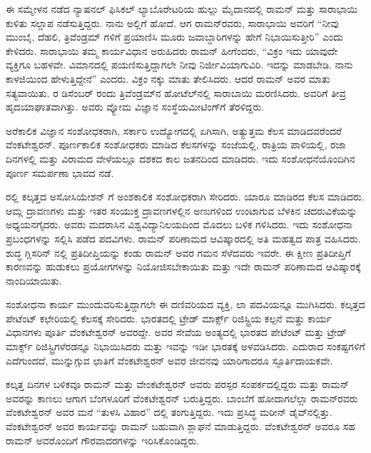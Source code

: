 ಈ ಸಮ್ಮೇಳನ ನಡೆದ ನ್ಯಾಷನಲ್ ಫಿಸಿಕಲ್ ಲ್ಯಾಬೊರೇಟರಿಯ ಹುಲ್ಲು ಮೈದಾನದಲ್ಲಿ ರಾಮನ್ ಮತ್ತು ಸಾರಾಭಾಯಿ ಕುಳಿತು ಸಲ್ಲಾಪ ನಡೆಸುತ್ತಿದ್ದರು. ನಾನು ಅಲ್ಲಿಗೆ ಹೋದೆ. ಆಗ ರಾಮನ್‍ರವರು, ಸಾರಾಭಾಯಿ ಅವರಿಗೆ “ನೀವು ಮುಂಬೈ, ದೆಹಲಿ, ತ್ರಿವೆಂಡ್ರಮ್ ಗಳಿಗೆ ಪ್ರಯಾಣಿಸಿ ಮೂರು ಜವಾಬ್ದಾರಿಗಳನ್ನು ಹೇಗೆ ನಿಭಾಯಿಸುತ್ತೀರಿ” ಎಂದು ಕೇಳಿದರು. ಸಾರಾಭಾಯಿ ತಮ್ಮ ಕಾರ್ಯವಿಧಾನ ಅರುಹಿದರು ರಾಮನ್ ಹೀಗೆಂದರು, “ವಿಕ್ರಂ ಇದು ಯಾವುದೇ ವ್ಯಕ್ತಿಗೂ ಬಹಳವೇ. ವಿಮಾನದಲ್ಲಿ ಪಯಣಿಸುತ್ತಿದ್ದಾಗಲೇ ನೀವು ನಿರ್ಜೀವಿಯಾಗುವಿರಿ. ಇದನ್ನು ಮಾಡಬೇಡಿ. ನಾನು ಕಾಳಜಿಯಿಂದ ಹೇಳುತ್ತಿದ್ದೇನೆ” ಎಂದರು. ವಿಕ್ರಂ ನಕ್ಕು ಮಾತು ತೇಲಿಸಿದರು. ಆದರೆ ರಾಮನ್ ಅವರ ಮಾತು ಸತ್ಯವಾಯಿತು. ರ ಡಿಸೆಂಬರ್ ರಂದು ತ್ರಿವೆಂಡ್ರಮ್‍ನ ಹೋಟೆಲ್‍ನಲ್ಲಿ ಸಾರಾಬಾಯಿ ಮರಣಿಸಿದರು. ಅವರಿಗೆ ತೀವ್ರ ಹೃದಯಾಘಾತವಾಗಿತ್ತು. ಅವರು ವ್ಯೋಮ ವಿಜ್ಞಾನ ಸಂಸ್ಥೆಯ\break ಮೀಟಿಂಗ್‍ಗೆ ತೆರಳಿದ್ದರು.



ಅರೆಕಾಲಿಕ ವಿಜ್ಞಾನ ಸಂಶೋಧಕರಾಗಿ, ಸರ್ಕಾರಿ ಉದ್ಯೋಗದಲ್ಲಿ ಏಗಿಸಾಗಿ, ಅತ್ಯುತ್ತಮ ಕೆಲಸ ಮಾಡಿದವರೆಂದರೆ ವೆಂಕಟೇಶ್ವರನ್. ಪೂರ್ಣಕಾಲಿಕ ಸಂಶೋಧಕರು ಮಾಡಿದ ಕೆಲಸಗಳನ್ನು ಸಂಜೆಯಲ್ಲಿ, ರಾತ್ರಿಯ ಪಾಳಿಯಲ್ಲಿ, ರಜಾ ದಿನಗಳಲ್ಲಿ ಮತ್ತು ವಿರಾಮದ ವೇಳೆಯಲ್ಲೂ ದಶಕದ ಕಾಲ ಜತನದಿಂದ ಮಾಡಿದರು. ಇದು ಸಂಶೋಧನೆಯೊಂದಿಗಿನ ಪೂರ್ಣ ಸಮರ್ಪಣಾ ಭಾವದ ನಡೆ.

ರಲ್ಲಿ ಕಲ್ಕತ್ತದ ಅಸೋಸಿಯೇಶನ್ ಗೆ ಅಂಶಕಾಲಿಕ ಸಂಶೋಧಕರಾಗಿ ಸೇರಿದರು. ಯಾರೂ ಮಾಡಿರದ ಕೆಲಸ ಮಾಡಿದರು. ಆಮ್ಲ ದ್ರಾವಣಗಳು ಮತ್ತು ಇತರ ಸಂಯುಕ್ತ ದ್ರಾವಣಗಳಲ್ಲಿನ ಅಣುಗಳಿಂದ ಉಂಟಾಗುವ ಬೆಳಕಿನ ಚದರುವಿಕೆಯನ್ನು ಅಧ್ಯಯನಗೈದರು. ಅವರು ಮದರಾಸಿನ ವಿಶ್ವವಿದ್ಯಾನಿಲಯದಿಂದ ಮೊದಲು  ಬಳಿಕ  ಗಳಿಸಿದರು. ಇದು ಸಂಶೋಧನಾ ಪ್ರಬಂಧಗಳನ್ನು ಸಲ್ಲಿಸಿ ಪಡೆದ ಪದವಿಗಳು. ರಾಮನ್ ಪರಿಣಾಮದ ಆವಿಷ್ಕಾರದಲ್ಲಿ ಅತಿ ಮಹತ್ವದ ಪಾತ್ರ ವಹಿಸಿದರು. ಶುದ್ಧ ಗ್ಲಿಸರಿನ್ ನಲ್ಲಿ ಪ್ರತಿದೀಪ್ತಿಯನ್ನು ಕಂಡು ರಾಮನ್ ಅವರ ಗಮನ ಸೆಳೆದವರು ಇವರೇ. ಈ ಕ್ಷೀಣ ಪ್ರತಿದೀಪ್ತಿಗೆ ಕಾರಣವನ್ನು ಹುಡುಕಲು ಪ್ರಯೋಗಗಳನ್ನು ನಿಯೋಜಿಸಬೇಕಾಯಿತು ಮತ್ತು ಇದೇ ರಾಮನ್ ಪರಿಣಾಮದ ಆವಿಷ್ಕಾರಕ್ಕೆ ನಾಂದಿಯಾಯಿತು.

ಸಂಶೋಧನಾ ಕಾರ್ಯ ಮುಂದುವರಿಸುತ್ತಿದ್ದಾಗಲೇ ಈ ದಣಿವರಿಯದ ವ್ಯಕ್ತಿ, ಲಾ ಪದವಿಯನ್ನೂ ಮುಗಿಸಿದರು. ಕಲ್ಕತ್ತದ ಪೇಟೆಂಟ್ ಕಛೇರಿಯಲ್ಲಿ ಕೆಲಸಕ್ಕೆ ಸೇರಿದರು. ಭಾರತದಲ್ಲಿ ಟ್ರೇಡ್ ಮಾರ್ಕ್ಸ್ ರಿಜಿಸ್ಟ್ರಿಯ ಕಲ್ಪನೆ ಮತ್ತು ಕಾರ್ಯ ವಿಧಾನಗಳು ಪೂರ್ತಿ ವೆಂಕಟೇಶ್ವರನ್ ಅವರದ್ದೇ. ಅವರ ಸೇವೆಯ ಅಂತ್ಯದಲ್ಲಿ ಭಾರತದ ಪೇಟೆಂಟ್ ಮತ್ತು ಟ್ರೇಡ್ ಮಾರ್ಕ್ಸ್ ರಿಜಿಸ್ಟ್ರಿಗಳೆರಡನ್ನೂ ನಿಭಾಯಿಸಿದರು ಮತ್ತು ಇವನ್ನು ಇಡೀ ಭಾರತಕ್ಕೆ ಅಳವಡಿಸಿದರು. ಎದುರಾದ ಸಂಕಷ್ಟಗಳಿಗೆ ಎದೆಗುಂದದೆ, ಮುನ್ನುಗ್ಗುವ ಛಾತಿಗೆ ವೆಂಕಟೇಶ್ವರನ್ ಅವರ ಜೀವನವು ಯಾರಿಗಾದರೂ ಸ್ಫೂರ್ತಿದಾಯಕವೇ.

\vskip 2pt

ಕಲ್ಕತ್ತ ದಿನಗಳ ಬಳಿಕವೂ ರಾಮನ್ ಮತ್ತು ವೇಂಕಟೇಶ್ವರನ್ ಅವರು ಪರಸ್ಪರ ಸಂಪರ್ಕದಲ್ಲಿದ್ದರು ಮತ್ತು ರಾಮನ್ ಅವರನ್ನು ಕಾಣಲು ಆಗಾಗ ಬೆಂಗಳೂರಿಗೆ ವೆಂಕಟೇಶ್ವರನ್ ಬರುತ್ತಿದ್ದರು. ಬಾಂಬೆಗೆ ಹೋದಾಗಲೆಲ್ಲಾ ರಾಮನ್‍ರವರು ವೆಂಕಟೇಶ್ವರನ್ ಅವರ ಮನೆ “ತುಳಸಿ ವಿಹಾರ” ದಲ್ಲಿ ತಂಗುತ್ತಿದ್ದರು. ಇದು ಪ್ರಸಿದ್ಧ ಮರೀನ್ ಡೈವ್‍ನಲ್ಲಿತ್ತು. ವೆಂಕಟೇಶ್ವರನ್ ಅವರ ಕಾರ್ಯವನ್ನು ರಾಮನ್ ಬಹುವಾಗಿ ಶ್ಲಾಘನೆ ಮಾಡುತ್ತಿದ್ದರು. ವೆಂಕಟೇಶ್ವರನ್ ಅವರೂ ಸಹ ರಾಮನ್ ಅವರೊಂದಿಗೆ ಗೌರವಾದರಗಳನ್ನು ಇರಿಸಿಕೊಂಡಿದ್ದರು.


